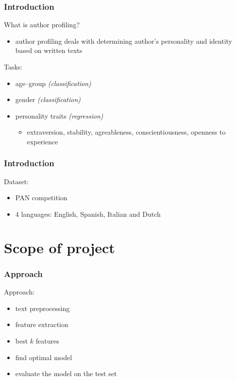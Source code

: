 \documentclass[utf8]{beamer}
\begin{document}
\begin{frame}
	\frametitle{Introduction}
	What is author profiling?
	\pause
	\begin{itemize}
		\item author profiling deals with determining author's personality and identity based on written texts
	\end{itemize}
		\pause
	\vspace{20px}
	Tasks:
	\pause
	\begin{itemize}
		\item age--group \textit{(classification)}
		\item gender \textit{(classification)}
		\item personality traits \textit{(regression)}
		\begin{itemize}
			\item extraversion, stability, agreableness, conscientiousness, openness to experience
		\end{itemize}
	\end{itemize}
\end{frame}


\begin{frame}
	\frametitle{Introduction}
	Dataset:
	\pause
	\begin{itemize}
		\item PAN competition
		\item 4 languages: English, Spanish, Italian and Dutch
	\end{itemize}
\end{frame}



\section{Scope of project}

\begin{frame}
	\frametitle{Approach}
	Approach:
	\pause
	\begin{itemize}
		\item text preprocessing
		\item feature extraction
		\item best $k$ features
		\item find optimal model
		\item evaluate the model on the test set
	\end{itemize}
\end{frame}
\end{document}
